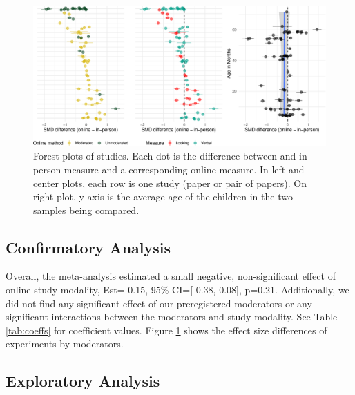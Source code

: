\documentclass[
  man,floatsintext]{apa6}
\begin{document}
\begin{figure}[h]

{\centering \includegraphics[width=1\linewidth]{OnlineMA_main_files/figure-latex/forest-1} 

}

\caption{Forest plots of studies. Each dot is the difference between and in-person measure and a corresponding online measure. In left and center plots, each row is one study (paper or pair of papers). On right plot, y-axis is the average age of the children in the two samples being compared.}\label{fig:forest}
\end{figure}

\hypertarget{confirmatory-analysis}{%
\subsection{Confirmatory Analysis}\label{confirmatory-analysis}}

Overall, the meta-analysis estimated a small negative, non-significant effect of online study modality, Est=-0.15, 95\% CI={[}-0.38, 0.08{]}, p=0.21. Additionally, we did not find any significant effect of our preregistered moderators or any significant interactions between the moderators and study modality. See Table \ref{tab:coeffs} for coefficient values. Figure \ref{fig:forest} shows the effect size differences of experiments by moderators.

\hypertarget{exploratory-analysis}{%
\subsection{Exploratory Analysis}\label{exploratory-analysis}}
\end{document}
